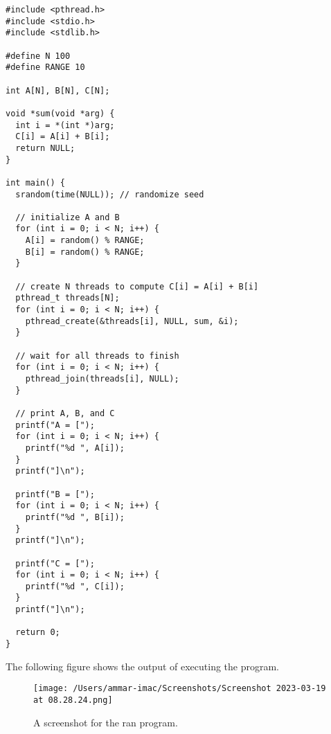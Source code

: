 \documentclass{article}
\begin{document}
\begin{lstlisting}[style=cstyle]
#include <pthread.h>
#include <stdio.h>
#include <stdlib.h>

#define N 100
#define RANGE 10

int A[N], B[N], C[N];

void *sum(void *arg) {
  int i = *(int *)arg;
  C[i] = A[i] + B[i];
  return NULL;
}

int main() {
  srandom(time(NULL)); // randomize seed

  // initialize A and B
  for (int i = 0; i < N; i++) {
    A[i] = random() % RANGE;
    B[i] = random() % RANGE;
  }

  // create N threads to compute C[i] = A[i] + B[i]
  pthread_t threads[N];
  for (int i = 0; i < N; i++) {
    pthread_create(&threads[i], NULL, sum, &i);
  }

  // wait for all threads to finish
  for (int i = 0; i < N; i++) {
    pthread_join(threads[i], NULL);
  }

  // print A, B, and C
  printf("A = [");
  for (int i = 0; i < N; i++) {
    printf("%d ", A[i]);
  }
  printf("]\n");

  printf("B = [");
  for (int i = 0; i < N; i++) {
    printf("%d ", B[i]);
  }
  printf("]\n");

  printf("C = [");
  for (int i = 0; i < N; i++) {
    printf("%d ", C[i]);
  }
  printf("]\n");

  return 0;
}
\end{lstlisting}


The following figure shows the output of executing the program.

\begin{figure}[ht]
	\centering
	\texttt{[image: /Users/ammar-imac/Screenshots/Screenshot 2023-03-19 at 08.28.24.png]}
	\caption{A screenshot for the ran program.}
\end{figure}


\newpage
\end{document}
